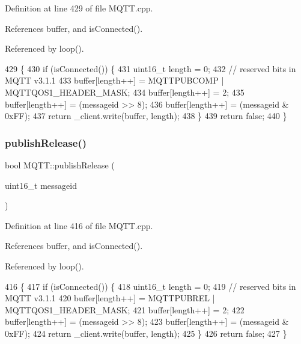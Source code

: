 Definition at line 429 of file M\+Q\+T\+T.\+cpp.



References buffer, and is\+Connected().



Referenced by loop().


\begin{DoxyCode}
429                                              \{
430     \textcolor{keywordflow}{if} (isConnected()) \{
431         uint16\_t length = 0;
432         \textcolor{comment}{// reserved bits in MQTT v3.1.1}
433         buffer[length++] = MQTTPUBCOMP | MQTTQOS1_HEADER_MASK;
434         buffer[length++] = 2;
435         buffer[length++] = (messageid >> 8);
436         buffer[length++] = (messageid & 0xFF);
437         \textcolor{keywordflow}{return} _client.write(buffer, length);
438     \}
439     \textcolor{keywordflow}{return} \textcolor{keyword}{false};
440 \}
\end{DoxyCode}
\mbox{\label{class_m_q_t_t_a3ec02b7dbe1fbea9f48ee3fc7cb3a9b8}} 
\subsubsection{publish\+Release()}
{\footnotesize\ttfamily bool M\+Q\+T\+T\+::publish\+Release (\begin{DoxyParamCaption}\item[{uint16\+\_\+t}]{messageid }\end{DoxyParamCaption})\hspace{0.3cm}{\ttfamily [private]}}



Definition at line 416 of file M\+Q\+T\+T.\+cpp.



References buffer, and is\+Connected().



Referenced by loop().


\begin{DoxyCode}
416                                             \{
417     \textcolor{keywordflow}{if} (isConnected()) \{
418         uint16\_t length = 0;
419         \textcolor{comment}{// reserved bits in MQTT v3.1.1}
420         buffer[length++] = MQTTPUBREL | MQTTQOS1_HEADER_MASK;
421         buffer[length++] = 2;
422         buffer[length++] = (messageid >> 8);
423         buffer[length++] = (messageid & 0xFF);
424         \textcolor{keywordflow}{return} _client.write(buffer, length);
425     \}
426     \textcolor{keywordflow}{return} \textcolor{keyword}{false};
427 \}
\end{DoxyCode}
\mbox{\label{class_m_q_t_t_aad0854b6a156344e03926ab53f15adbd}} 

